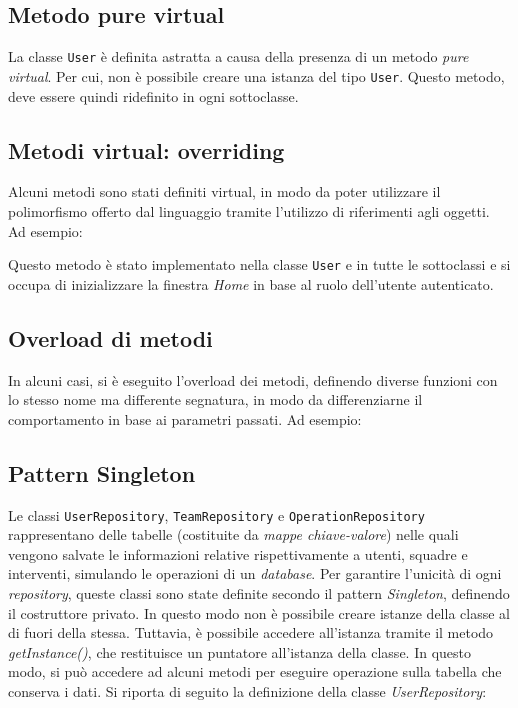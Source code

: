 \subsection{Metodo pure virtual}
La classe \texttt{User} è definita astratta a causa della presenza di un metodo \textit{pure virtual}. Per cui, non è possibile creare una istanza del tipo \texttt{User}. Questo metodo, deve essere quindi ridefinito in ogni sottoclasse.


\subsection{Metodi virtual: overriding}
Alcuni metodi sono stati definiti virtual, in modo da poter utilizzare il polimorfismo offerto dal linguaggio tramite l'utilizzo di riferimenti agli oggetti. Ad esempio:

Questo metodo è stato implementato nella classe \texttt{User} e in tutte le sottoclassi e si occupa di inizializzare la finestra \textit{Home} in base al ruolo dell'utente autenticato.

\subsection{Overload di metodi}
In alcuni casi, si è eseguito l'overload dei metodi, definendo diverse funzioni con lo stesso nome ma differente segnatura, in modo da differenziarne il comportamento in base ai parametri passati. Ad esempio:


\subsection{Pattern Singleton}\label{sec:singleton}
Le classi \texttt{UserRepository}, \texttt{TeamRepository} e \texttt{OperationRepository} rappresentano delle tabelle (costituite da \textit{mappe chiave-valore}) nelle quali vengono salvate le informazioni relative rispettivamente a utenti, squadre e interventi, simulando le operazioni di un \textit{database}. Per garantire l'unicità di ogni \textit{repository}, queste classi sono state definite secondo il pattern \textit{Singleton}, definendo il costruttore privato. In questo modo non è possibile creare istanze della classe al di fuori della stessa. Tuttavia, è possibile accedere all'istanza tramite il metodo \textit{getInstance()}, che restituisce un puntatore all'istanza della classe. In questo modo, si può accedere ad alcuni metodi per eseguire operazione sulla tabella che conserva i dati. Si riporta di seguito la definizione della classe \textit{UserRepository}:


